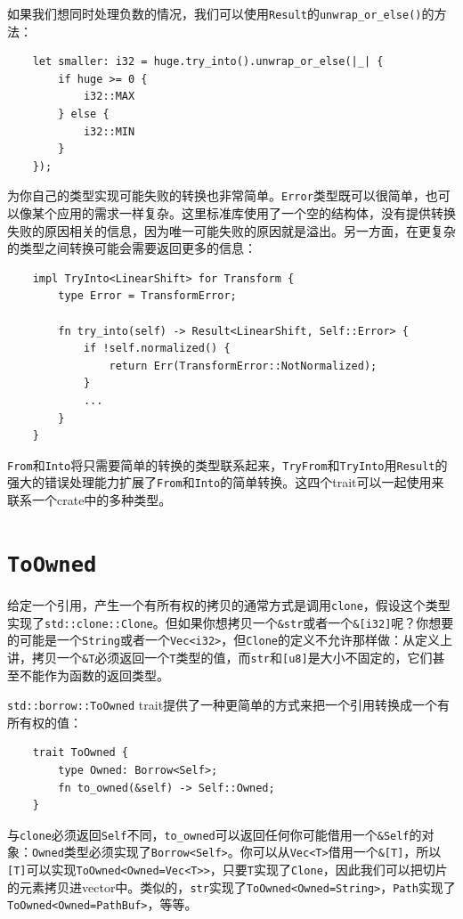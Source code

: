 如果我们想同时处理负数的情况，我们可以使用\texttt{Result}的\texttt{unwrap\_or\_else()}的方法：
\begin{verbatim}
    let smaller: i32 = huge.try_into().unwrap_or_else(|_| {
        if huge >= 0 {
            i32::MAX
        } else {
            i32::MIN
        }
    });
\end{verbatim}

为你自己的类型实现可能失败的转换也非常简单。\texttt{Error}类型既可以很简单，也可以像某个应用的需求一样复杂。这里标准库使用了一个空的结构体，没有提供转换失败的原因相关的信息，因为唯一可能失败的原因就是溢出。另一方面，在更复杂的类型之间转换可能会需要返回更多的信息：
\begin{verbatim}
    impl TryInto<LinearShift> for Transform {
        type Error = TransformError;

        fn try_into(self) -> Result<LinearShift, Self::Error> {
            if !self.normalized() {
                return Err(TransformError::NotNormalized);
            }
            ...
        }
    }
\end{verbatim}

\texttt{From}和\texttt{Into}将只需要简单的转换的类型联系起来，\texttt{TryFrom}和\texttt{TryInto}用\texttt{Result}的强大的错误处理能力扩展了\texttt{From}和\texttt{Into}的简单转换。这四个trait可以一起使用来联系一个crate中的多种类型。

\section{\texttt{ToOwned}}\label{toowned}

给定一个引用，产生一个有所有权的拷贝的通常方式是调用\texttt{clone}，假设这个类型实现了\texttt{std::clone::Clone}。但如果你想拷贝一个\texttt{\&str}或者一个\texttt{\&[i32]}呢？你想要的可能是一个\texttt{String}或者一个\texttt{Vec<i32>}，但\texttt{Clone}的定义不允许那样做：从定义上讲，拷贝一个\texttt{\&T}必须返回一个\texttt{T}类型的值，而\texttt{str}和\texttt{[u8]}是大小不固定的，它们甚至不能作为函数的返回类型。

\texttt{std::borrow::ToOwned} trait提供了一种更简单的方式来把一个引用转换成一个有所有权的值：
\begin{verbatim}
    trait ToOwned {
        type Owned: Borrow<Self>;
        fn to_owned(&self) -> Self::Owned;
    }
\end{verbatim}

与\texttt{clone}必须返回\texttt{Self}不同，\texttt{to\_owned}可以返回任何你可能借用一个\texttt{\&Self}的对象：\texttt{Owned}类型必须实现了\texttt{Borrow<Self>}。你可以从\texttt{Vec<T>}借用一个\texttt{\&[T]}，所以\texttt{[T]}可以实现\texttt{ToOwned<Owned=Vec<T>>}，只要\texttt{T}实现了\texttt{Clone}，因此我们可以把切片的元素拷贝进vector中。类似的，\texttt{str}实现了\texttt{ToOwned<Owned=String>}，\texttt{Path}实现了\texttt{ToOwned<Owned=PathBuf>}，等等。

